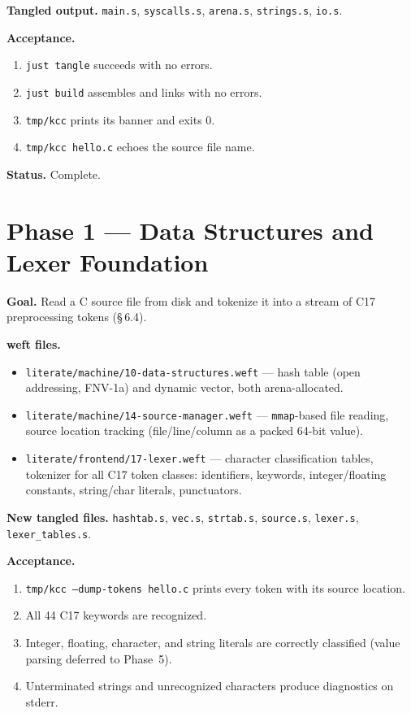\documentclass[11pt,a4paper,twoside,openright,DIV=15]{scrbook}
\theoremstyle{definition}
\theoremstyle{plain}
\theoremstyle{remark}
\newcommand{\stdref}[1]{\S\,#1}
\begin{document}
\textbf{Tangled output.}
\texttt{main.s}, \texttt{syscalls.s}, \texttt{arena.s},
\texttt{strings.s}, \texttt{io.s}.

\textbf{Acceptance.}
\begin{enumerate}
\item \texttt{just tangle} succeeds with no errors.
\item \texttt{just build} assembles and links with no errors.
\item \texttt{tmp/kcc} prints its banner and exits 0.
\item \texttt{tmp/kcc hello.c} echoes the source file name.
\end{enumerate}

\textbf{Status.} Complete.

\section{Phase 1 --- Data Structures and Lexer Foundation}
\label{sec:phase1}

\textbf{Goal.}  Read a C source file from disk and tokenize it into
a stream of C17 preprocessing tokens (\stdref{6.4}).

\textbf{weft files.}
\begin{itemize}
\item \texttt{literate/machine/10-data-structures.weft} ---
      hash table (open addressing, FNV-1a) and dynamic vector,
      both arena-allocated.
\item \texttt{literate/machine/14-source-manager.weft} ---
      \texttt{mmap}-based file reading, source location tracking
      (file/line/column as a packed 64-bit value).
\item \texttt{literate/frontend/17-lexer.weft} ---
      character classification tables, tokenizer for all C17
      token classes: identifiers, keywords, integer/floating
      constants, string/char literals, punctuators.
\end{itemize}

\textbf{New tangled files.}
\texttt{hashtab.s}, \texttt{vec.s}, \texttt{strtab.s},
\texttt{source.s}, \texttt{lexer.s}, \texttt{lexer\_tables.s}.

\textbf{Acceptance.}
\begin{enumerate}
\item \texttt{tmp/kcc --dump-tokens hello.c} prints every token
      with its source location.
\item All 44 C17 keywords are recognized.
\item Integer, floating, character, and string literals are
      correctly classified (value parsing deferred to Phase~5).
\item Unterminated strings and unrecognized characters produce
      diagnostics on stderr.
\end{enumerate}
\end{document}

